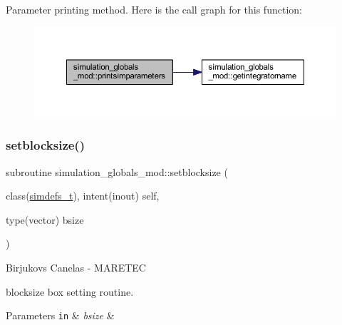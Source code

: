 Parameter printing method. Here is the call graph for this function\+:
\nopagebreak
\begin{figure}[H]
\begin{center}
\leavevmode
\includegraphics[width=350pt]{namespacesimulation__globals__mod_a97c04d0289a9f2d004a9329cb7ab16f0_cgraph}
\end{center}
\end{figure}
\mbox{\label{namespacesimulation__globals__mod_aa65b43534d2d2b6366a4ebc791194805}} 
\subsubsection{\texorpdfstring{setblocksize()}{setblocksize()}}
{\footnotesize\ttfamily subroutine simulation\+\_\+globals\+\_\+mod\+::setblocksize (\begin{DoxyParamCaption}\item[{class(\hyperlink{structsimulation__globals__mod_1_1simdefs__t}{simdefs\+\_\+t}), intent(inout)}]{self,  }\item[{type(vector)}]{bsize }\end{DoxyParamCaption})\hspace{0.3cm}{\ttfamily [private]}}



Birjukovs Canelas -\/ M\+A\+R\+E\+T\+EC 

blocksize box setting routine. 
\begin{DoxyParams}[1]{Parameters}
\mbox{\tt in}  & {\em bsize} & \\
\hline
\end{DoxyParams}
\mbox{\label{namespacesimulation__globals__mod_a412b0779703630189e2ea14e4b390864}} 
